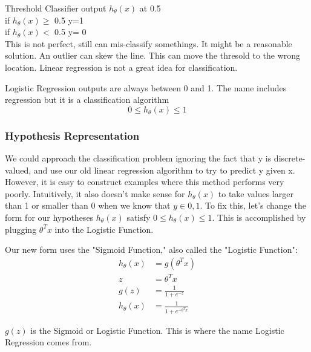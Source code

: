 Threshold Classifier output $h_{\theta}(x)$ at 0.5\\
if $h_{\theta}(x) \geq$ 0.5 y=1\\
if $h_{\theta}(x) <$ 0.5 y= 0\\
This is not perfect, still can mis-classify somethings.  It might be a reasonable solution. An outlier can skew the line.  This can move the thresold to the wrong location.  Linear regression is not a great idea for classification.

Logistic Regression outputs are always between 0 and 1.  The name includes regression but it is a classification algorithm\\
$$
0 \leq h_{\theta}(x) \leq 1
$$

\subsubsection{Hypothesis Representation}

We could approach the classification problem ignoring the fact that y is discrete-valued, and use our old linear regression algorithm to try to predict y given x. However, it is easy to construct examples where this method performs very poorly. Intuitively, it also doesn’t make sense for $h_\theta (x)$ to take values larger than 1 or smaller than 0 when we know that $y \in {0, 1}$. To fix this, let’s change the form for our hypotheses $h_\theta (x)$ satisfy $0 \leq h_\theta (x) \leq 1$. This is accomplished by plugging $\theta^Tx$ into the Logistic Function.


Our new form uses the "Sigmoid Function," also called the "Logistic Function":
\begin{equation}
  \begin{aligned}
    h_{\theta}(x) &= g(\theta^{T}x)\\
    z &= \theta^{T}x \\
    g(z) &= \frac{1}{1+e^{-z}}\\
    h_{\theta}(x) &= \frac{1}{1+e^{-\theta^{T}x}}
  \end{aligned}
\end{equation}

$g(z)$ is the Sigmoid or Logistic Function.  This is where the name Logistic Regression comes from.\\

